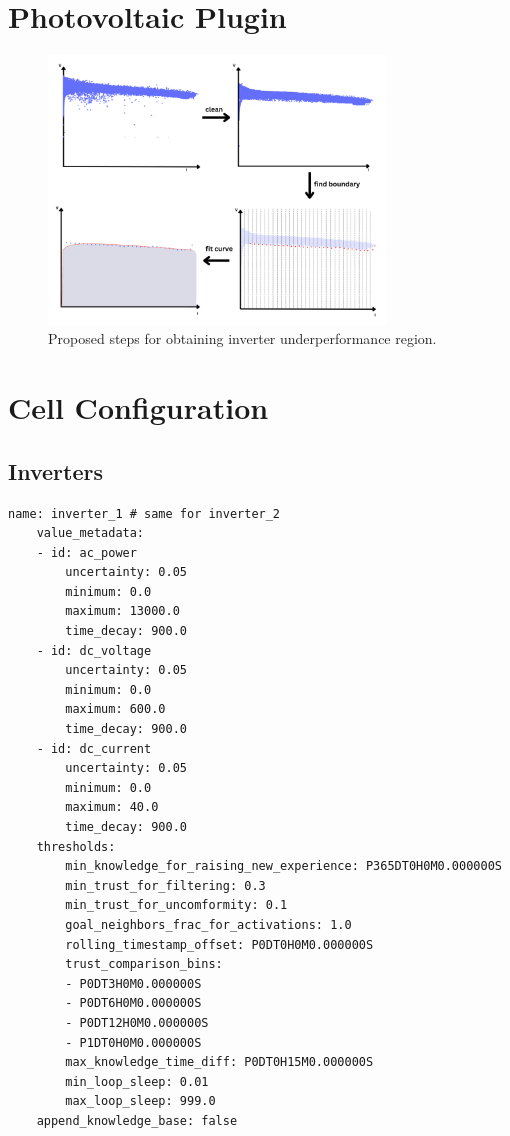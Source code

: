 \FloatBarrier

\section{Photovoltaic Plugin}

\begin{figure}[h!]
    \centering
    \includegraphics[width=0.8\textwidth]{figures/appendix/b_analysis/plugin_steps-1.png}
    \caption{Proposed steps for obtaining inverter underperformance region.}
    \label{fig:pluginsteps}
\end{figure}

\FloatBarrier

\section{Cell Configuration}  \label{ap2:cellconfig}

\subsection{Inverters}

\begin{lstlisting}[style=yaml]
    name: inverter_1 # same for inverter_2
    value_metadata:
    - id: ac_power
        uncertainty: 0.05
        minimum: 0.0
        maximum: 13000.0
        time_decay: 900.0
    - id: dc_voltage
        uncertainty: 0.05
        minimum: 0.0
        maximum: 600.0
        time_decay: 900.0
    - id: dc_current
        uncertainty: 0.05
        minimum: 0.0
        maximum: 40.0
        time_decay: 900.0
    thresholds:
        min_knowledge_for_raising_new_experience: P365DT0H0M0.000000S
        min_trust_for_filtering: 0.3
        min_trust_for_uncomformity: 0.1
        goal_neighbors_frac_for_activations: 1.0
        rolling_timestamp_offset: P0DT0H0M0.000000S
        trust_comparison_bins:
        - P0DT3H0M0.000000S
        - P0DT6H0M0.000000S
        - P0DT12H0M0.000000S
        - P1DT0H0M0.000000S
        max_knowledge_time_diff: P0DT0H15M0.000000S
        min_loop_sleep: 0.01
        max_loop_sleep: 999.0
    append_knowledge_base: false
\end{lstlisting}

